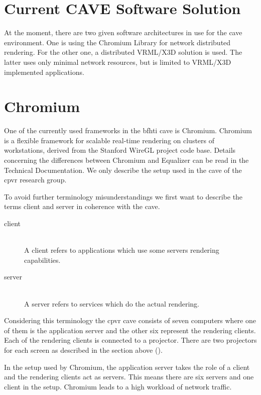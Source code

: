 \section{Current CAVE Software Solution}
At the moment, there are two given software architectures in use for the \gls{cave} environment. One is using the Chromium Library for network distributed  rendering. For the other one, a distributed VRML/X3D solution is used. The latter uses only minimal network resources, but is limited to VRML/X3D implemented applications.

\section{Chromium}
One of the currently used frameworks in the \gls{bfhti} \gls{cave} is Chromium\cite{website:chromiumWeb}. Chromium is a flexible framework for scalable real-time rendering on clusters of workstations, derived from the Stanford WireGL project code base. Details concerning the differences between Chromium and Equalizer can be read in the Technical Documentation. We only describe the setup used in the \gls{cave} of the \gls{cpvr} research group.

To avoid further terminology misunderstandings we first want to describe the terms client and server in coherence with the \gls{cave}.

\begin{description}
	\item[client] \hfill\\A client refers to applications which use some servers rendering capabilities.
	\item[server] \hfill\\A server refers to services which do the actual rendering.
\end{description}

Considering this terminology the \gls{cpvr} \gls{cave} consists of seven computers where one of them is the application server and the other six represent the rendering clients. Each of the rendering clients is connected to a projector. There are two projectors for each screen as described in the section above ().

In the setup used by Chromium, the application server takes the role of a client and the rendering clients act as servers. This means there are six servers and one client in the setup.  Chromium leads to a high workload of network traffic.

